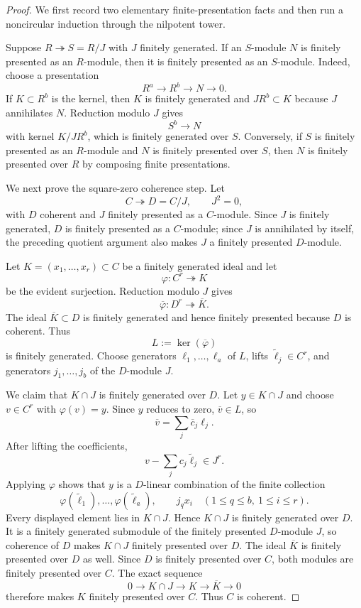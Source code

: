 \begin{proof}
We first record two elementary finite-presentation facts and then run a
noncircular induction through the nilpotent tower.

Suppose $R\twoheadrightarrow S=R/J$ with $J$ finitely generated.  If an
$S$-module $N$ is finitely presented as an $R$-module, then it is finitely
presented as an $S$-module.  Indeed, choose a presentation
\[
    R^a\longrightarrow R^b\longrightarrow N\longrightarrow0.
\]
If $K\subset R^b$ is the kernel, then $K$ is finitely generated and
$JR^b\subset K$ because $J$ annihilates $N$.  Reduction modulo $J$ gives
\[
    S^b\longrightarrow N
\]
with kernel $K/JR^b$, which is finitely generated over $S$.  Conversely, if
$S$ is finitely presented as an $R$-module and $N$ is finitely presented over
$S$, then $N$ is finitely presented over $R$ by composing finite
presentations.

We next prove the square-zero coherence step.  Let
\[
    C\twoheadrightarrow D=C/J,
    \qquad J^2=0,
\]
with $D$ coherent and $J$ finitely presented as a $C$-module.  Since $J$ is
finitely generated, $D$ is finitely presented as a $C$-module; since $J$ is
annihilated by itself, the preceding quotient argument also makes $J$ a
finitely presented $D$-module.

Let $K=(x_1,\ldots,x_r)\subset C$ be a finitely generated ideal and let
\[
    \varphi:C^r\twoheadrightarrow K
\]
be the evident surjection.  Reduction modulo $J$ gives
\[
    \overline\varphi:D^r\twoheadrightarrow\overline K.
\]
The ideal $\overline K\subset D$ is finitely generated and hence finitely
presented because $D$ is coherent.  Thus
\[
    L:=\ker(\overline\varphi)
\]
is finitely generated.  Choose generators
$\ell_1,\ldots,\ell_a$ of $L$, lifts
$\widetilde\ell_j\in C^r$, and generators
$j_1,\ldots,j_b$ of the $D$-module $J$.

We claim that $K\cap J$ is finitely generated over $D$.  Let $y\in K\cap J$
and choose $v\in C^r$ with $\varphi(v)=y$.  Since $y$ reduces to zero,
$\overline v\in L$, so
\[
    \overline v
    =
    \sum_j\overline c_j\ell_j.
\]
After lifting the coefficients,
\[
    v-\sum_jc_j\widetilde\ell_j\in J^r.
\]
Applying $\varphi$ shows that $y$ is a $D$-linear combination of the finite
collection
\[
    \varphi(\widetilde\ell_1),\ldots,
    \varphi(\widetilde\ell_a),
    \qquad
    j_qx_i
    \quad
    (1\leq q\leq b,\ 1\leq i\leq r).
\]
Every displayed element lies in $K\cap J$.  Hence $K\cap J$ is finitely
generated over $D$.  It is a finitely generated submodule of the finitely
presented $D$-module $J$, so coherence of $D$ makes $K\cap J$ finitely
presented over $D$.  The ideal $\overline K$ is finitely presented over $D$
as well.  Since $D$ is finitely presented over $C$, both modules are finitely
presented over $C$.  The exact sequence
\[
    0\longrightarrow K\cap J
    \longrightarrow K
    \longrightarrow\overline K
    \longrightarrow0
\]
therefore makes $K$ finitely presented over $C$.  Thus $C$ is coherent.


\end{proof}
